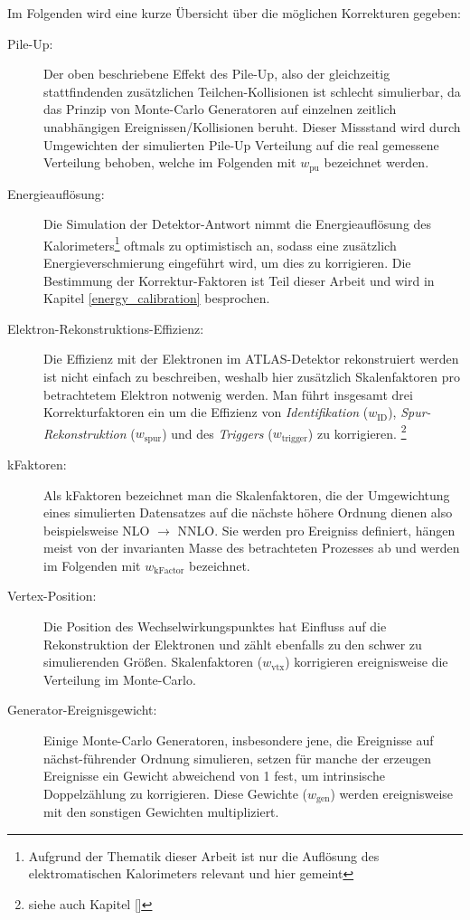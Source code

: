 Im Folgenden wird eine kurze Übersicht über die möglichen Korrekturen gegeben:

\begin{description}
    \item[Pile-Up:] Der oben beschriebene Effekt des Pile-Up, also der
        gleichzeitig stattfindenden zusätzlichen Teilchen-Kollisionen ist
        schlecht simulierbar, da das Prinzip von Monte-Carlo Generatoren auf
        einzelnen zeitlich unabhängigen Ereignissen/Kollisionen beruht. Dieser
        Missstand wird durch Umgewichten der simulierten Pile-Up Verteilung auf
        die real gemessene Verteilung behoben, welche im Folgenden mit
        $w_\text{pu}$ bezeichnet werden.
    \item[Energieauflösung:] Die Simulation der Detektor-Antwort nimmt die
        Energieauflösung des Kalorimeters\footnote{Aufgrund der Thematik dieser
        Arbeit ist nur die Auflösung des elektromatischen Kalorimeters relevant
        und hier gemeint} oftmals zu optimistisch an, sodass eine zusätzlich
        Energieverschmierung eingeführt wird, um dies zu korrigieren. Die
        Bestimmung der Korrektur-Faktoren ist Teil dieser Arbeit und wird in
        Kapitel \ref{energy_calibration} besprochen.
    \item[Elektron-Rekonstruktions-Effizienz:] Die Effizienz mit der Elektronen
        im ATLAS-Detektor rekonstruiert werden ist nicht einfach zu
        beschreiben, weshalb hier zusätzlich Skalenfaktoren pro betrachtetem
        Elektron notwenig werden. Man führt insgesamt drei Korrekturfaktoren
        ein um die Effizienz von \textit{Identifikation} ($w_\text{ID}$),
        \textit{Spur-Rekonstruktion} ($w_\text{spur}$) und des
        \textit{Triggers} ($w_\text{trigger}$) zu korrigieren.
        \footnote{siehe auch Kapitel \ref{}}
    \item[kFaktoren:] Als kFaktoren bezeichnet man die Skalenfaktoren, die der
        Umgewichtung eines simulierten Datensatzes auf die nächste höhere
        Ordnung dienen also beispielsweise NLO $\rightarrow$ NNLO. Sie werden
        pro Ereigniss definiert, hängen meist von der invarianten Masse des
        betrachteten Prozesses ab und werden im Folgenden mit
        $w_\text{kFactor}$ bezeichnet.
    \item[Vertex-Position:] Die Position des Wechselwirkungspunktes hat
        Einfluss auf die Rekonstruktion der Elektronen und zählt ebenfalls zu
        den schwer zu simulierenden Größen. Skalenfaktoren ($w_\text{vtx}$)
        korrigieren ereignisweise die Verteilung im Monte-Carlo.
    \item[Generator-Ereignisgewicht:] Einige Monte-Carlo Generatoren,
        insbesondere jene, die Ereignisse auf nächst-führender Ordnung
        simulieren, setzen für manche der erzeugen Ereignisse ein Gewicht
        abweichend von 1 fest, um intrinsische Doppelzählung zu korrigieren.
        Diese Gewichte ($w_\text{gen}$) werden ereignisweise mit den sonstigen
        Gewichten multipliziert.
\end{description}

